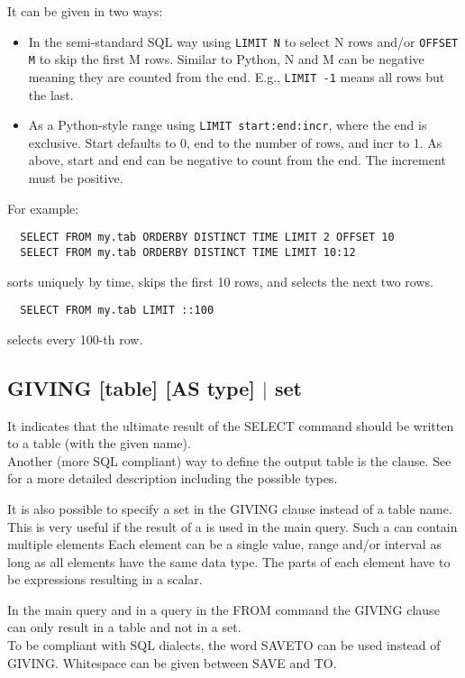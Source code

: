 It can be given in two ways:
\begin{itemize}
\item In the semi-standard SQL way using \texttt{LIMIT N} to select N rows
  and/or \texttt{OFFSET M} to skip the first M rows. Similar to Python, N
  and M can be negative meaning they are counted from the end. E.g.,
  \texttt{LIMIT -1} means all rows but the last.
\item As a Python-style range using \texttt{LIMIT start:end:incr}, where the end is
  exclusive. Start defaults to 0, end to the number of rows, and incr
  to 1. As above, start and end can be negative to count from the
  end. The increment must be positive.
\end{itemize}
For example:
\begin{verbatim}
  SELECT FROM my.tab ORDERBY DISTINCT TIME LIMIT 2 OFFSET 10
  SELECT FROM my.tab ORDERBY DISTINCT TIME LIMIT 10:12
\end{verbatim}
sorts uniquely by time, skips the first 10 rows, and selects the next
two rows.
\begin{verbatim}
  SELECT FROM my.tab LIMIT ::100
\end{verbatim}
selects every 100-th row.

\subsection{\label{TAQL:GIVING}GIVING [table] [AS type] $|$ set}
It indicates that the ultimate result of the SELECT command should be
written to a table (with the given name).
\\Another (more SQL compliant) way to define the output table
is the  clause. See 
for a more detailed description including the possible types.

It is also possible to specify a set in the GIVING clause
instead of a table name. This is very useful if the result of a
 is used in the main query.
Such a  can contain multiple elements
Each element can be a single value, range and/or interval as
long as all elements have the same data type.
The parts of each element have to be expressions resulting in a scalar.

In the main query and in a query in the FROM command the
GIVING clause can only result in a table and not in a set.
\\To be compliant with SQL dialects, the word SAVETO can be
used instead of GIVING. Whitespace can be given between SAVE and TO.
 

